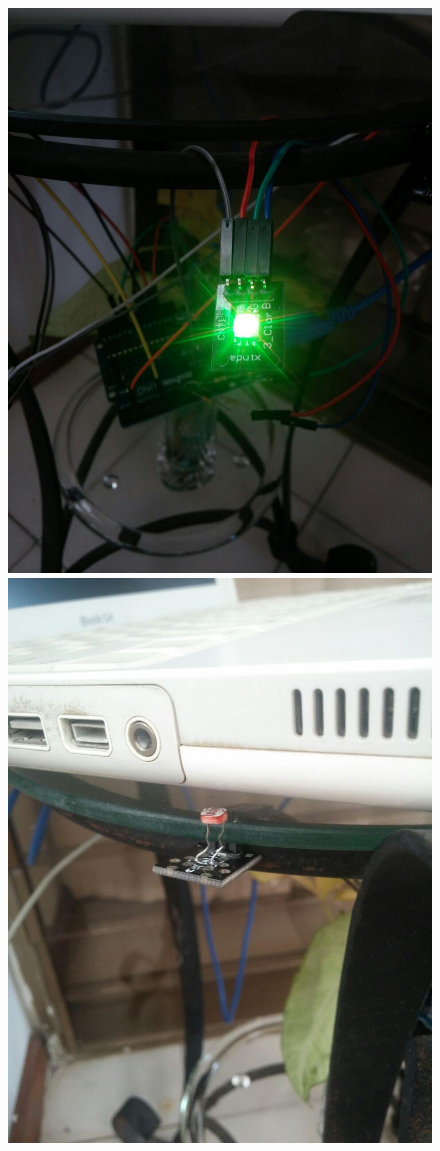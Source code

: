 \begin{itemize}
\begin{figure}[!htb]
\includegraphics[scale=0.11]{./Figuras/rgb_ext.jpg}
\includegraphics[scale=0.11]{./Figuras/fotorresistencia.jpg}

\end{figure}
\end{itemize}

